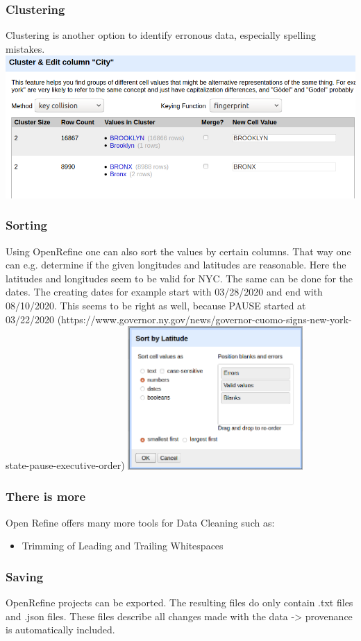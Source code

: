 \documentclass{beamer}
\begin{document}
\begin{frame}
\frametitle{Clustering}
Clustering is another option to identify erronous data, especially spelling mistakes.
\vfill
\includegraphics[width = \textwidth]{pictures/clustering.png}
\end{frame}
\begin{frame}
\frametitle{Sorting}
Using OpenRefine one can also sort the values by certain columns. That way one can e.g. determine if the given longitudes and latitudes are reasonable.
Here the latitudes and longitudes seem to be valid for NYC.
\vfill
The same can be done for the dates. The creating dates for example start with 03/28/2020 and end with 08/10/2020. This seems to be right as well, because PAUSE started at 03/22/2020 (https://www.governor.ny.gov/news/governor-cuomo-signs-new-york-state-pause-executive-order)
\includegraphics[width=0.5\textwidth]{pictures/sorting.png}
\end{frame}
\begin{frame}
\frametitle{There is more}
Open Refine offers many more tools for Data Cleaning such as:
\begin{itemize}
\item Trimming of Leading and Trailing Whitespaces
\end{itemize}
\end{frame}
\begin{frame}
\frametitle{Saving}
OpenRefine projects can be exported. The resulting files do only contain .txt files and .json files. These files describe all changes made with the data -> provenance is automatically included.
\end{frame}
\end{document}

